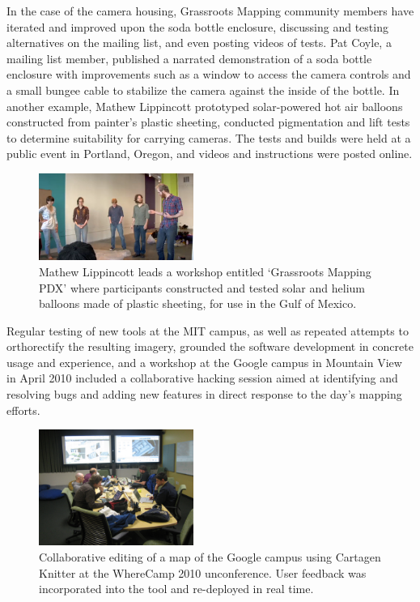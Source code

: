 \documentclass[11pt,oneside,notitlepage]{report}
\begin{document}
In the case of the camera housing, Grassroots Mapping community members have iterated and improved upon the soda bottle enclosure, discussing and testing alternatives on the mailing list, and even posting videos of tests. Pat Coyle, a mailing list member, published a narrated demonstration of a soda bottle enclosure with improvements such as a window to access the camera controls and a small bungee cable to stabilize the camera against the inside of the bottle. In another example, Mathew Lippincott prototyped solar-powered hot air balloons constructed from painter's plastic sheeting, conducted pigmentation and lift tests to determine suitability for carrying cameras. The tests and builds were held at a public event in Portland, Oregon, and videos and instructions were posted online.

\begin{figure}
	\begin{flushright}
		\includegraphics[width=0.45\textwidth]{images/lippincott-workshop.png}
		\caption{Mathew Lippincott leads a workshop entitled `Grassroots Mapping PDX' where participants constructed and tested solar and helium balloons made of plastic sheeting, for use in the Gulf of Mexico.}
	\end{flushright}
\end{figure}

Regular testing of new tools at the MIT campus, as well as repeated attempts to orthorectify the resulting imagery, grounded the software development in concrete usage and experience, and a workshop at the Google campus in Mountain View in April 2010 included a collaborative hacking session aimed at identifying and resolving bugs and adding new features in direct response to the day's mapping efforts. 

\begin{figure}
	\begin{flushright}
		\includegraphics[width=0.45\textwidth]{images/asynchronous-editing.jpg}
		\caption{Collaborative editing of a map of the Google campus using Cartagen Knitter at the WhereCamp 2010 unconference. User feedback was incorporated into the tool and re-deployed in real time.}
	\end{flushright}
\end{figure}
\end{document}
